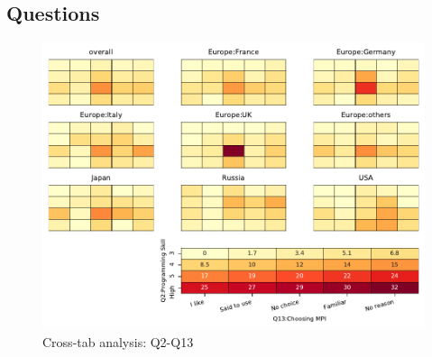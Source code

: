 
\subsection{Questions}


\begin{figure}
\begin{center}
\includegraphics[width=12cm]{../pdfs/Q2-Q13.pdf}
\caption{Cross-tab analysis: Q2-Q13}
\label{fig:Q2-Q13}
\end{center}
\end{figure}
